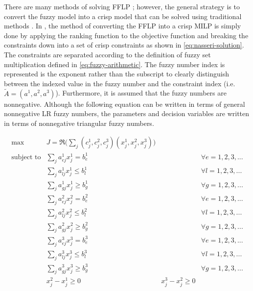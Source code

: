 \documentclass[11pt,a4paper,final]{article}
\begin{document}
There are many methods of solving FFLP
\cite{bello-2019-fuzzy-activ,kaur-2016-introd-fuzzy,ebrahimnejad-2016-new-method,nasseri-2013-fully}; however, the
general strategy is to convert the fuzzy model into a crisp model that can be solved using traditional methods
\cite{bello-2019-fuzzy-activ}. In \cite{nasseri-2013-fully,bello-2019-fuzzy-activ}, the method of converting the FFLP
into a crisp MILP is simply done by applying the ranking function to the objective function and breaking the constraints
down into a set of crisp constraints as shown in \ref{eq:nasseri-solution}. The constraints are separated according to the
definition of fuzzy set multiplication defined in \ref{eq:fuzzy-arithmetic}. The fuzzy number index is represented is the
exponent rather than the subscript to clearly distinguish between the indexed value in the fuzzy number and the
constraint index (i.e. \(\tilde{A} = (a^1,a^2,a^3)\)). Furthermore, it is assumed that the fuzzy numbers are nonnegative.
Although the following equation can be written in terms of general nonnegative LR fuzzy numbers, the parameters and
decision variables are written in terms of nonnegative triangular fuzzy numbers.

\begin{equation}
\label{eq:nasseri-solution}
\begin{array}{lclc}
\text{max}   & J = \mathfrak{R}\Big(\sum_j (c_j^1,c_j^2,c_j^3)(x_j^1,x_j^2,x_j^3)\Big) &\\
\text{subject to} & \sum_j a_{ej}^1 x_j^1 = b_e^1 & & \forall e = 1,2,3,... \\
                  & \sum_j a_{lj}^1 x_j^1 \le b_l^1 & & \forall l = 1,2,3,... \\
                  & \sum_j a_{gj}^1 x_j^1 \ge b_g^1  & & \forall g = 1,2,3,... \\
                  & \sum_j a_{ej}^2 x_j^2 = b_e^2 & & \forall e = 1,2,3,... \\
                  & \sum_j a_{lj}^2 x_j^2 \le b_l^2 & & \forall l = 1,2,3,... \\
                  & \sum_j a_{gj}^2 x_j^2 \ge b_g^2  & & \forall g = 1,2,3,... \\
                  & \sum_j a_{ej}^3 x_j^3 = b_e^3 & & \forall e = 1,2,3,... \\
                  & \sum_j a_{lj}^3 x_j^3 \le b_l^3 & & \forall l = 1,2,3,... \\
                  & \sum_j a_{gj}^3 x_j^3 \ge b_g^3  & & \forall g = 1,2,3,... \\
                  & x_j^2 - x_j^1 \ge 0         & x_j^3 - x_j^2 \ge 0 & \\
\end{array}
\end{equation}
\end{document}

